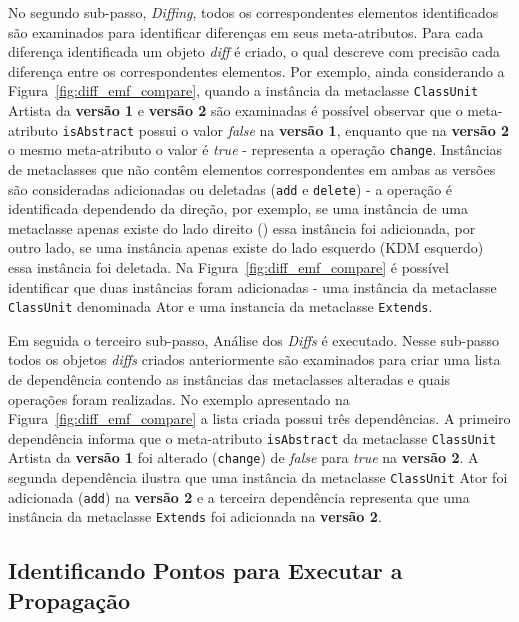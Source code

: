 No segundo sub-passo, \textit{Diffing}, todos os correspondentes elementos identificados são examinados para identificar diferenças em seus meta-atributos. Para cada diferença identificada um objeto \textit{diff} é criado, o qual descreve com precisão cada diferença entre os correspondentes elementos. Por exemplo, ainda considerando a Figura~\ref{fig:diff_emf_compare}, quando a instância da metaclasse \texttt{ClassUnit} Artista da \textbf{versão 1} e \textbf{versão 2} são examinadas é possível observar que o meta-atributo \texttt{isAbstract} possui o valor \textit{false} na \textbf{versão 1}, enquanto que na \textbf{versão 2} o mesmo meta-atributo o valor é \textit{true} - representa a operação \texttt{change}. Instâncias de metaclasses que não contêm elementos correspondentes em ambas as versões são consideradas adicionadas ou deletadas (\texttt{add} e \texttt{delete}) - a operação é identificada dependendo da direção, por exemplo, se uma instância de uma metaclasse apenas existe do lado direito () essa instância foi adicionada, por outro lado, se uma instância apenas existe do lado esquerdo (KDM esquerdo) essa instância foi deletada. Na Figura~\ref{fig:diff_emf_compare} é possível identificar que duas instâncias foram adicionadas - uma instância da metaclasse \texttt{ClassUnit} denominada Ator e uma instancia da metaclasse \texttt{Extends}.

Em seguida o terceiro sub-passo, Análise dos \textit{Diffs} é executado. Nesse sub-passo todos os objetos \textit{diffs} criados anteriormente são examinados para criar uma lista de dependência contendo as instâncias das metaclasses alteradas e quais operações foram realizadas. No exemplo apresentado na Figura~\ref{fig:diff_emf_compare} a lista criada possui três dependências. A primeiro dependência informa que o meta-atributo \texttt{isAbstract} da metaclasse \texttt{ClassUnit} Artista da \textbf{versão 1} foi alterado (\texttt{change}) de \textit{false} para \textit{true} na \textbf{versão 2}. A segunda dependência ilustra que uma instância da metaclasse \texttt{ClassUnit} Ator foi adicionada (\texttt{add}) na \textbf{versão 2} e a terceira dependência representa que uma instância da metaclasse \texttt{Extends} foi adicionada na \textbf{versão 2}.


\subsection{Identificando Pontos para Executar a Propagação}\label{subsec:identificandoPontoParaExecutarApropagacao}

